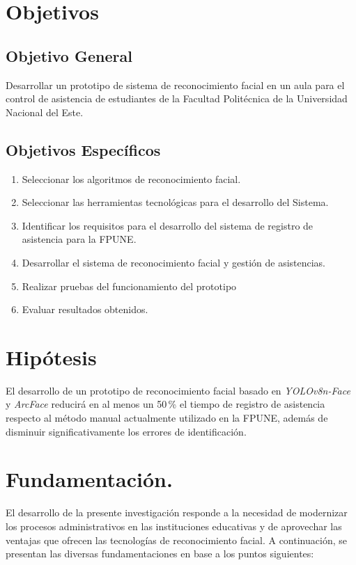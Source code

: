 \section{Objetivos}
\subsection{Objetivo General}
Desarrollar un prototipo de sistema de reconocimiento facial en un aula para el control de asistencia de estudiantes de la Facultad Politécnica de la Universidad Nacional del Este.
\subsection{Objetivos Específicos}
\begin{enumerate}
    \item Seleccionar los algoritmos de reconocimiento facial.
    \item Seleccionar las herramientas tecnológicas para el desarrollo del Sistema.
    \item Identificar los requisitos para el desarrollo del sistema de registro de asistencia para la FPUNE.
    \item Desarrollar el sistema de reconocimiento facial y gestión de asistencias.
    \item Realizar pruebas del funcionamiento del prototipo
    \item Evaluar resultados obtenidos.
\end{enumerate}




\section{Hipótesis}

El desarrollo de un prototipo de reconocimiento facial basado en \textit{YOLOv8n-Face} y \textit{ArcFace} reducirá en al menos un 50\,\% el tiempo de registro de asistencia respecto al método manual actualmente utilizado en la FPUNE, además de disminuir significativamente los errores de identificación.

\section{Fundamentación.}

El desarrollo de la presente investigación responde a la necesidad de modernizar los procesos administrativos en las instituciones educativas y de aprovechar las ventajas que ofrecen las tecnologías de reconocimiento facial. A continuación, se presentan las diversas fundamentaciones en base a los puntos siguientes:


